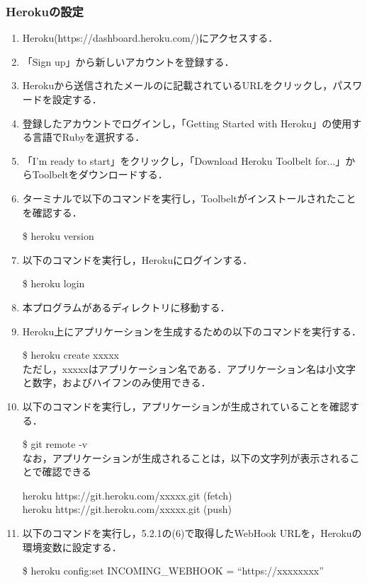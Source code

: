 \documentclass[fleqn, 14pt]{sty/extarticlej}
\begin{document}
\subsubsection{Herokuの設定}
\begin{enumerate}
\item Heroku(https://dashboard.heroku.com/)にアクセスする．
\item 「Sign up」から新しいアカウントを登録する．
\item Herokuから送信されたメールのに記載されているURLをクリックし，パスワードを設定する．
\item 登録したアカウントでログインし，「Getting Started with Heroku」の使用する言語でRubyを選択する．
\item 「I'm ready to start」をクリックし，「Download Heroku Toolbelt for...」からToolbeltをダウンロードする．
\item ターミナルで以下のコマンドを実行し，Toolbeltがインストールされたことを確認する．
  
  \$ heroku version\\
  
\item 以下のコマンドを実行し，Herokuにログインする．
  
  \$ heroku login\\

\item 本プログラムがあるディレクトリに移動する．
  
\item Heroku上にアプリケーションを生成するための以下のコマンドを実行する．
  
  \$ heroku create xxxxx\\
  
  ただし，xxxxxはアプリケーション名である．アプリケーション名は小文字と数字，およびハイフンのみ使用できる．
  
\item 以下のコマンドを実行し，アプリケーションが生成されていることを確認する．
  
  \$ git remote -v\\

  なお，アプリケーションが生成されることは，以下の文字列が表示されることで確認できる
  
  heroku https://git.heroku.com/xxxxx.git (fetch)\\
  heroku https://git.heroku.com/xxxxx.git (push)\\

\item 以下のコマンドを実行し，5.2.1の(6)で取得したWebHook URLを，Herokuの環境変数に設定する．

  \$ heroku config:set INCOMING\_WEBHOOK = ``https://xxxxxxxx''
  
\end{enumerate}
\end{document}
